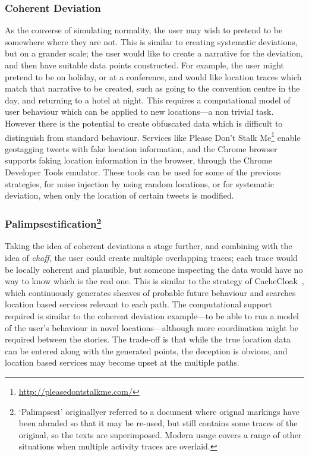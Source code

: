 \documentclass{IOS-Book-Article}     %
\newcommand{\tbox}[3][red]{{
\color{#1}\noindent{
   \fbox{\scriptsize{ {\bf #2} \textsl{#3}}}
   \vspace{2pt}
}
}}
\newcommand{\todo}[1]{\tbox{TODO:}{#1}}
\begin{document}
\subsubsection{Coherent Deviation}
As the converse of simulating normality, the user may wish to pretend to be
somewhere where they are not. 
This is similar
to creating systematic deviations, but on a grander scale; the user would like
to create a narrative for the deviation, and then have suitable data points
constructed. For example, the user might pretend to be on holiday, or at a
conference, and would like location traces which match that narrative to be
created, such as going to the convention centre in the day, and returning to a
hotel at night. This requires a computational model of user behaviour which can
be applied to new locations---a non trivial task. However there is the potential
to create obfuscated data which is difficult to distinguish from standard
behaviour. Services like Please Don't Stalk 
Me\footnote{\url{http://pleasedontstalkme.com/}} enable geotagging tweets 
with fake location information, and the Chrome browser supports faking location 
information in the browser, through the Chrome Developer Tools emulator. These 
tools can be used for some of the previous strategies, for noise injection by 
using random locations, or for systematic deviation, when only the location of 
certain tweets is modified.

\subsubsection{Palimpsestification\footnote{`Palimpsest' originallyer referred
to a document where orignal markings have been abraded so that it may be
re-used, but still contains some traces of the original, so the texts are
superimposed. Modern usage covers a range of other situations when multiple
activity traces are overlaid.}}

 Taking the idea of coherent deviations a stage further, and combining with the idea of 
\emph{chaff}, the user could create multiple overlapping traces; 
each trace would be locally coherent and plausible, but someone inspecting the 
data would have no way to know which is the real one.
This is similar to the strategy of 
CacheCloak~\cite{Meyerowitz:2009:HSF:1614320.1614358}, which
continuously generates sheaves of probable future behaviour and searches
location based services relevant to each  path. The computational support
required is similar to the coherent deviation example---to be able to run a
model of the user's behaviour in novel locations---although more coordination
might be required between the stories. The trade-off is that while the true
location data can be entered along with the generated points, the deception is
obvious, and location based services may become upset at the multiple paths.
\end{document}
